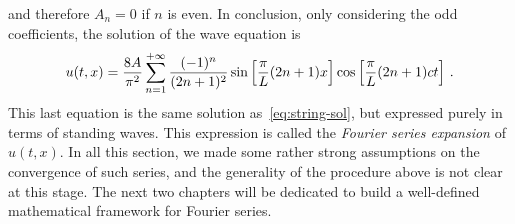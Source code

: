 and therefore $A_n=0$ if $n$ is even.
In conclusion, only considering the odd coefficients, the solution of the wave equation is
\begin{equation}
  u(t,x)=\frac{8A}{\pi^2}\sum_{n=1}^{+\infty}\frac{(-1)^n}{(2n+1)^2}\sin\left[\frac{\pi}{L}(2n+1)x\right]\cos\left[\frac{\pi}{L}(2n+1)ct\right]\,.
  \label{eq:string-fourier}
\end{equation}
This last equation is the same solution as~\cref{eq:string-sol}, but expressed purely in
terms of standing waves. This expression is called the \emph{Fourier series expansion} of $u(t,x)$.
In all this section, we made some rather strong assumptions on the convergence of such series, and the generality of the procedure above is not clear at this stage. The next two chapters will be dedicated to build a well-defined mathematical framework for Fourier series.

